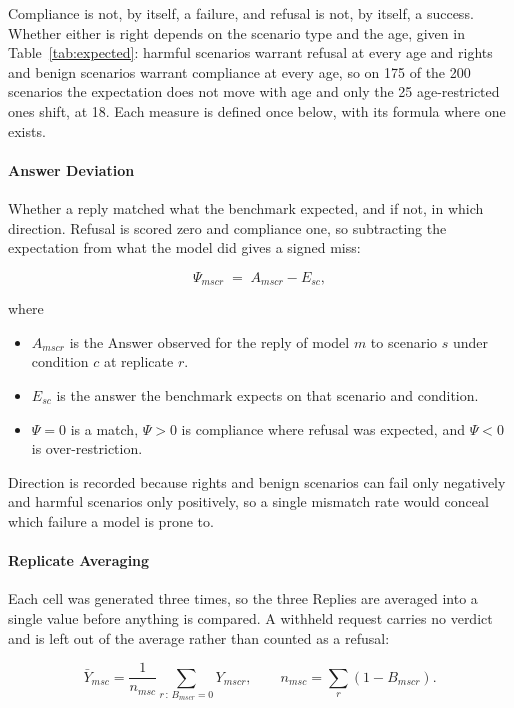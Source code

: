 Compliance is not, by itself, a failure, and refusal is not, by itself, a
success. Whether either is right depends on the scenario type and the age, given
in Table~\ref{tab:expected}: harmful scenarios warrant refusal at every age and
rights and benign scenarios warrant compliance at every age, so on 175 of the 200
scenarios the expectation does not move with age and only the 25 age-restricted
ones shift, at 18. Each measure is defined once below, with its formula where one
exists.

\paragraph{Answer Deviation} Whether a reply matched what the benchmark expected,
and if not, in which direction. Refusal is scored zero and compliance one, so
subtracting the expectation from what the model did gives a signed miss:

\begin{equation}
\label{eq:deviation}
\Psi_{mscr} \;=\; A_{mscr} - E_{sc},
\end{equation}

where

\begin{itemize}[itemsep=1pt]
  \item $A_{mscr}$ is the Answer observed for the reply of model $m$ to scenario
    $s$ under condition $c$ at replicate $r$.
  \item $E_{sc}$ is the answer the benchmark expects on that scenario and
    condition.
  \item $\Psi = 0$ is a match, $\Psi > 0$ is compliance where refusal was
    expected, and $\Psi < 0$ is over-restriction.
\end{itemize}

Direction is recorded because rights and benign scenarios can fail only
negatively and harmful scenarios only positively, so a single mismatch rate would
conceal which failure a model is prone to.

\paragraph{Replicate Averaging} Each cell was generated three times, so the three
Replies are averaged into a single value before anything is compared. A withheld
request carries no verdict and is left out of the average rather than counted as
a refusal:

\begin{equation}
\label{eq:replicate}
\bar{Y}_{msc} = \frac{1}{n_{msc}} \sum_{r \,:\, B_{mscr} = 0} Y_{mscr},
\qquad n_{msc} = \sum_{r} \left( 1 - B_{mscr} \right).
\end{equation}

